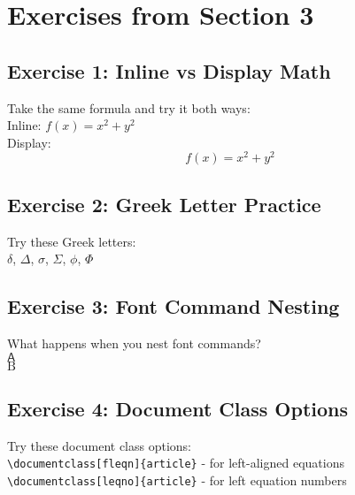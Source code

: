 \documentclass{article}
\begin{document}
\section{Exercises from Section 3}

\subsection{Exercise 1: Inline vs Display Math}
Take the same formula and try it both ways: \\
Inline: $f(x) = x^{2} + y^{2}$ \\
Display: 
\[
f(x) = x^{2} + y^{2}
\]

\subsection{Exercise 2: Greek Letter Practice}
Try these Greek letters: \\
$\delta$, $\Delta$, $\sigma$, $\Sigma$, $\phi$, $\Phi$

\subsection{Exercise 3: Font Command Nesting}
What happens when you nest font commands? \\
$\mathbf{\mathsf{A}}$ \\
$\mathit{\mathrm{B}}$ \\

\subsection{Exercise 4: Document Class Options}
Try these document class options: \\
\texttt{\textbackslash documentclass[fleqn]\{article\}} - for left-aligned equations \\
\texttt{\textbackslash documentclass[leqno]\{article\}} - for left equation numbers
\end{document}
